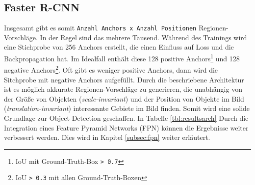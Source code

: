 \subsection{Faster R-CNN}\label{subsec:fasterR-cnn}
 Insgesamt gibt es somit \texttt{Anzahl Anchors x Anzahl Positionen} Regionen-Vorschläge. In der Regel sind das mehrere Tausend.
Während des Trainings wird eine Stichprobe von 256 Anchors erstellt, die einen Einfluss auf Loss und die Backpropagation hat. Im Idealfall enthält diese 128 positive Anchors\footnote{IoU mit Ground-Truth-Box \texttt{> 0.7}} und 128 negative Anchors\footnote{IoU \texttt{> 0.3} mit allen Ground-Truth-Boxen}. Oft gibt es weniger positive Anchors, dann wird die Sitchprobe mit negative Anchors aufgefüllt.
Durch die beschriebene Architektur ist es möglich akkurate Regionen-Vorschläge zu generieren, die unabhängig von der Größe von Objekten (\textit{scale-invariant}) und der Position von Objekte im Bild (\textit{translation-invariant}) interessante Gebiete im Bild finden. Somit wird eine solide Grundlage zur Object Detection geschaffen. In Tabelle \ref{tbl:resultsarch}
Durch die Integration eines Feature Pyramid Networks (FPN) können die Ergebnisse weiter verbessert werden. Dies wird in Kapitel \ref{subsec:fpn} weiter erläutert.
